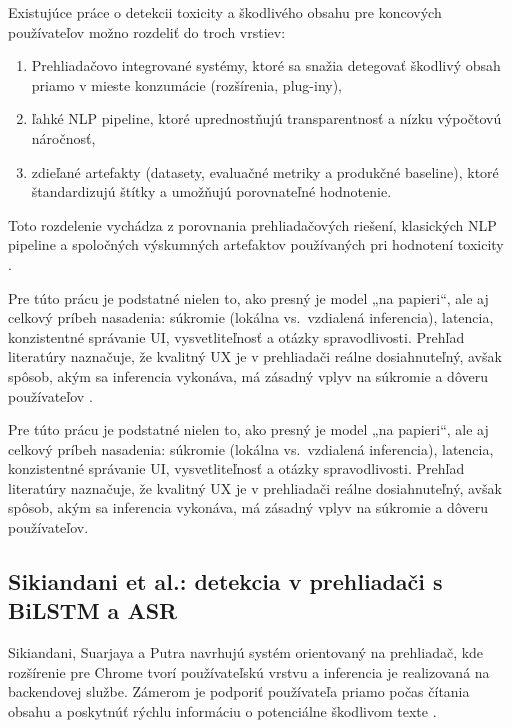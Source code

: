 Existujúce práce o detekcii toxicity a škodlivého obsahu pre koncových používateľov možno rozdeliť do troch vrstiev:
\begin{enumerate}
  \item Prehliadačovo integrované systémy, ktoré sa snažia detegovať škodlivý obsah priamo v mieste konzumácie (rozšírenia, plug-iny),
  \item ľahké NLP pipeline, ktoré uprednostňujú transparentnosť a nízku výpočtovú náročnosť,
  \item zdieľané artefakty (datasety, evaluačné metriky a produkčné baseline), ktoré štandardizujú štítky a umožňujú porovnateľné hodnotenie.
\end{enumerate}
Toto rozdelenie vychádza z porovnania prehliadačových riešení, klasických NLP pipeline a spoločných výskumných artefaktov používaných pri hodnotení toxicity \cite{jigsaw2018toxic}\cite{jigsaw2019bias}\cite{kumar2024eliminating}\cite{sikiandani2025browser}\cite{deep2024integrated}\cite{perspectiveAPI}.

Pre túto prácu je podstatné nielen to, ako presný je model „na papieri“, ale aj celkový príbeh nasadenia: súkromie (lokálna vs.\ vzdialená inferencia), latencia, konzistentné správanie UI, vysvetliteľnosť a otázky spravodlivosti. Prehľad literatúry naznačuje, že kvalitný UX je v prehliadači reálne dosiahnuteľný, avšak spôsob, akým sa inferencia vykonáva, má zásadný vplyv na súkromie a dôveru používateľov \cite{tfjsToxicity}\cite{chromemv3}\cite{edpb2019dpbdd}\cite{hatexplain2021}\cite{borkan2019nuanced}.

Pre túto prácu je podstatné nielen to, ako presný je model „na papieri“, ale aj celkový príbeh nasadenia: súkromie (lokálna vs.\ vzdialená inferencia), latencia, konzistentné správanie UI, vysvetliteľnosť a otázky spravodlivosti. Prehľad literatúry naznačuje, že kvalitný UX je v prehliadači reálne dosiahnuteľný, avšak spôsob, akým sa inferencia vykonáva, má zásadný vplyv na súkromie a dôveru používateľov.

\subsection{Sikiandani et al.: detekcia v prehliadači s BiLSTM a ASR}\label{subsec:sikiandani_related}
Sikiandani, Suarjaya a Putra navrhujú systém orientovaný na prehliadač, kde rozšírenie pre Chrome tvorí používateľskú vrstvu a inferencia je realizovaná na backendovej službe. Zámerom je podporiť používateľa priamo počas čítania obsahu a poskytnúť rýchlu informáciu o potenciálne škodlivom texte \cite{sikiandani2025browser}.

